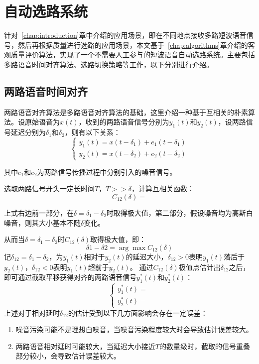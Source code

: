 \chapter{自动选路系统}
\label{chapter:switching}

针对~\ref{chap:introduction}章中介绍的应用场景，即在不同地点接收多路短波语音信号，然后再根据质量进行选路的应用场景，本文基于~\ref{chap:algorithms}章介绍的客观质量评价算法，实现了一个不需要人工参与的短波语音自动选路系统。主要包括多路语音时间对齐算法、选路切换策略等工作，以下分别进行介绍。

\section{两路语音时间对齐}\label{section:align2}

两路语音对齐算法是多路语音对齐算法的基础，这里介绍一种基于互相关的朴素算法。设原始语音为$x(t)$，收到的两路语音信号分别为$y_1(t)$和$y_2(t)$，设两路信号延迟分别为$\delta_1$和$\delta_2$，则有以下关系：
\begin{equation}
\left\{
    \begin{array}{l}
        y_1(t) = x(t-\delta_1) + e_1(t-\delta_1) \\
        y_2(t) = x(t-\delta_2) + e_2(t-\delta_2)
    \end{array}
\right.
\end{equation}

其中$e_1$和$e_2$为两路信号传播过程中分别引入的噪音信号。

选取两路信号开头一定长时间$T，T>>\delta$，计算互相关函数：
\begin{equation}\label{eq:corr}
C_{12}(\delta) = 
\end{equation}

上式右边前一部分，在$\delta=\delta_1-\delta_2$时取得极大值，第二部分，假设噪音均为高斯白噪音，则其大小基本不随$\delta$变化。

从而当$\delta=\delta_1-\delta_2$时$C_{12}(\delta)$取得极大值，即：
\begin{equation}
\delta1 - \delta2 = \arg \max C_{12}(\delta)
\end{equation}
记$\delta_{12}=\delta_1-\delta_2$，为$y_1 (t)$相对于$y_2 (t)$的延迟大小，$\delta_{12}>0$表明$y_1(t)$落后于$y_2(t)$，$\delta_{12}<0$表明$y_1(t)$超前于$y_2(t)$。
通过$C_{12}(\delta)$极值点估计出$\delta_{12}$之后，即可通过截取平移获得对齐的两路语音信号$y_1^*(t)$和$y_2^*(t)$：
\begin{equation}
\left\{
    \begin{array}{l}
        y_1^*(t)= \\
        y_2^*(t)=
    \end{array}
\right.
\end{equation}
上述对于相对延时$δ_{12}$的估计受到以下几方面影响会存在一定误差：
\begin{enumerate}
\item 噪音污染可能不是理想白噪音，当噪音污染程度较大时会导致估计误差较大。
\item 两路语音相对延时可能较大，当延迟大小接近$T$的数量级时，截取的信号重叠部分较小，会导致估计误差较大。
\end{enumerate}


